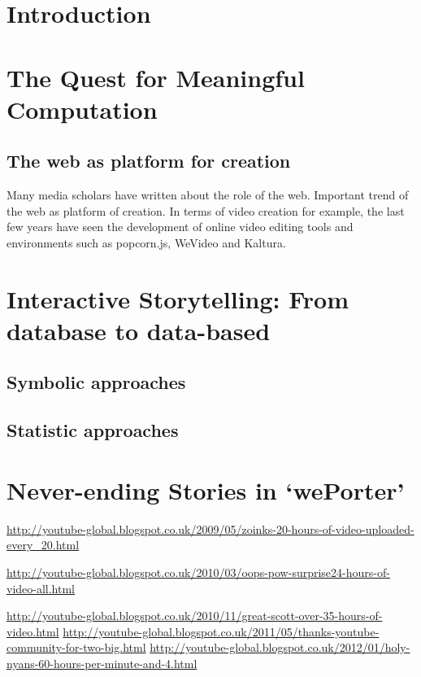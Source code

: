 \documentclass[11pt, a4paper]{report}
\begin{document}
\tableofcontents
\pagebreak

\section{Introduction}
\label{sec:introduction}

\section{The Quest for Meaningful Computation}
\label{sec:quest}


\subsection{The web as platform for creation}

Many media scholars have written about the role of the web.
Important trend of the web as platform of creation. In terms of video creation for example, the last few years have seen the development of online video editing tools and environments such as popcorn.js, WeVideo and Kaltura.

\section{Interactive Storytelling: From database to data-based}
\label{sec:storytelling}
\subsection{Symbolic approaches}
\label{sec:symbolic}
\subsection{Statistic approaches}
\label{sec:statistic}

\section{Never-ending Stories in `wePorter'}
\url{http://youtube-global.blogspot.co.uk/2009/05/zoinks-20-hours-of-video-uploaded-every_20.html}

\url{http://youtube-global.blogspot.co.uk/2010/03/oops-pow-surprise24-hours-of-video-all.html}

\url{http://youtube-global.blogspot.co.uk/2010/11/great-scott-over-35-hours-of-video.html}
\url{http://youtube-global.blogspot.co.uk/2011/05/thanks-youtube-community-for-two-big.html}
\url{http://youtube-global.blogspot.co.uk/2012/01/holy-nyans-60-hours-per-minute-and-4.html}
\end{document}
